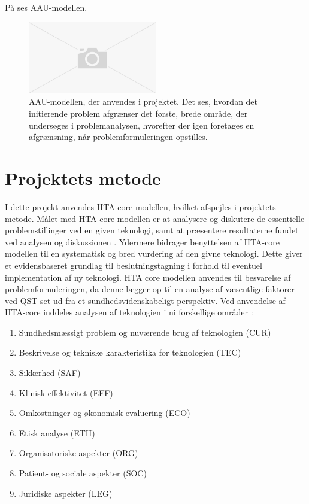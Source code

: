  På  ses AAU-modellen. 

\begin{figure}[H] 
	\begin{center}
		\includegraphics[width=0.5\textwidth]{figures/cMetode/AAUmodel}
	\end{center}
	\caption{AAU-modellen, der anvendes i projektet. Det ses, hvordan det initierende problem afgrænser det første, brede område, der undersøges i problemanalysen, hvorefter der igen foretages en afgrænsning, når problemformuleringen opstilles.} 
	\label{fig:AAUmodel} 
\end{figure}



\section{Projektets metode}
I dette projekt anvendes HTA core modellen, hvilket afspejles i projektets metode. Målet med HTA core modellen er at analysere og diskutere de essentielle problemstillinger ved en given teknologi, samt at præsentere resultaterne fundet ved analysen og diskussionen \citep{HTAcore}. Ydermere bidrager benyttelsen af HTA-core modellen til en systematisk og bred vurdering af den givne teknologi. Dette giver et evidensbaseret grundlag til beslutningstagning i forhold til eventuel implementation af ny teknologi. \citep{mtvhaandbog2007} \citep{HTAcore}  HTA core modellen anvendes til besvarelse af problemformuleringen, da denne lægger op til en analyse af væsentlige faktorer ved QST set ud fra et sundhedsvidenskabeligt perspektiv. Ved anvendelse af HTA-core inddeles analysen af teknologien i ni forskellige områder \citep{HTAcore}:

\begin{enumerate}
\item Sundhedsmæssigt problem og nuværende brug af teknologien (CUR)
\item Beskrivelse og tekniske karakteristika for teknologien (TEC)
\item Sikkerhed (SAF)
\item Klinisk effektivitet (EFF)
\item Omkostninger og økonomisk evaluering (ECO)
\item Etisk analyse (ETH)
\item Organisatoriske aspekter (ORG)
\item Patient- og sociale aspekter (SOC)
\item Juridiske aspekter (LEG)
\end{enumerate}

